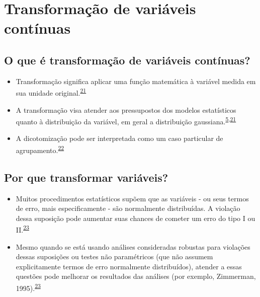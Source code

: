 \documentclass[
]{book}
\begin{document}
\hypertarget{transformacao}{%
\section{Transformação de variáveis contínuas}\label{transformacao}}

\hypertarget{o-que-uxe9-transformauxe7uxe3o-de-variuxe1veis-contuxednuas}{%
\subsection{O que é transformação de variáveis contínuas?}\label{o-que-uxe9-transformauxe7uxe3o-de-variuxe1veis-contuxednuas}}

\begin{itemize}
\item
  Transformação significa aplicar uma função matemática à variável medida em sua unidade original.\textsuperscript{\protect\hyperlink{ref-Bland1996}{21}}
\item
  A transformação visa atender aos pressupostos dos modelos estatísticos quanto à distribuição da variável, em geral a distribuição gaussiana.\textsuperscript{\protect\hyperlink{ref-vetter2017}{5},\protect\hyperlink{ref-Bland1996}{21}}
\item
  A dicotomização pode ser interpretada como um caso particular de agrupamento.\textsuperscript{\protect\hyperlink{ref-Fedorov2009}{22}}
\end{itemize}

\hypertarget{por-que-transformar-variuxe1veis}{%
\subsection{Por que transformar variáveis?}\label{por-que-transformar-variuxe1veis}}

\begin{itemize}
\item
  Muitos procedimentos estatísticos supõem que as variáveis - ou seus termos de erro, mais especificamente - são normalmente distribuídas. A violação dessa suposição pode aumentar suas chances de cometer um erro do tipo I ou II.\textsuperscript{\protect\hyperlink{ref-osborne2010}{23}}
\item
  Mesmo quando se está usando análises consideradas robustas para violações dessas suposições ou testes não paramétricos (que não assumem explicitamente termos de erro normalmente distribuídos), atender a essas questões pode melhorar os resultados das análises (por exemplo, Zimmerman, 1995).\textsuperscript{\protect\hyperlink{ref-osborne2010}{23}}
\end{itemize}
\end{document}
